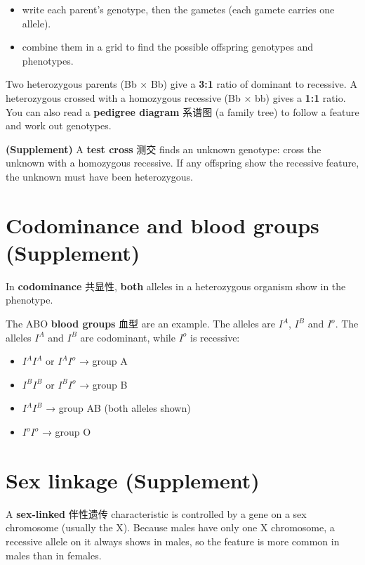 \documentclass[11pt]{article}
\begin{document}
\begin{itemize}
\item write each parent's genotype, then the gametes (each gamete carries one allele).

\item combine them in a grid to find the possible offspring genotypes and phenotypes.

\end{itemize}

Two heterozygous parents (Bb × Bb) give a \textbf{3:1} ratio of dominant to recessive. A heterozygous crossed with a homozygous recessive (Bb × bb) gives a \textbf{1:1} ratio. You can also read a \textbf{pedigree diagram} 系谱图 (a family tree) to follow a feature and work out genotypes.

\textbf{(Supplement)} A \textbf{test cross} 测交 finds an unknown genotype: cross the unknown with a homozygous recessive. If any offspring show the recessive feature, the unknown must have been heterozygous.

\section*{Codominance and blood groups (Supplement)}

In \textbf{codominance} 共显性, \textbf{both} alleles in a heterozygous organism show in the phenotype.

The ABO \textbf{blood groups} 血型 are an example. The alleles are $I^A$, $I^B$ and $I^o$. The alleles $I^A$ and $I^B$ are codominant, while $I^o$ is recessive:

\begin{itemize}
\item $I^A I^A$ or $I^A I^o$ → group A

\item $I^B I^B$ or $I^B I^o$ → group B

\item $I^A I^B$ → group AB (both alleles shown)

\item $I^o I^o$ → group O

\end{itemize}

\section*{Sex linkage (Supplement)}

A \textbf{sex-linked} 伴性遗传 characteristic is controlled by a gene on a sex chromosome (usually the X). Because males have only one X chromosome, a recessive allele on it always shows in males, so the feature is more common in males than in females.
\end{document}
